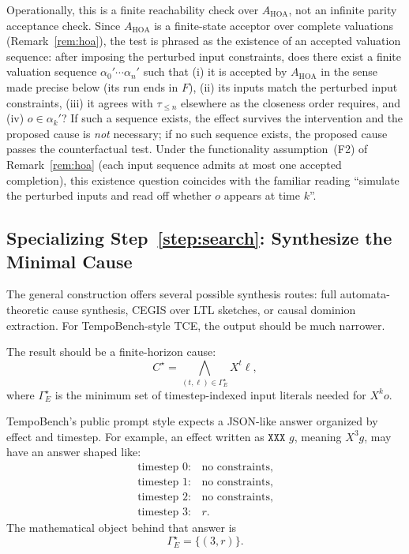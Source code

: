 \documentclass[11pt]{article}
\theoremstyle{remark}
\begin{document}
Operationally, this is a finite reachability check over \(A_{\mathrm{HOA}}\), not
an infinite parity acceptance check. Since \(A_{\mathrm{HOA}}\) is a finite-state
acceptor over complete valuations (Remark~\ref{rem:hoa}), the test is phrased as
the existence of an accepted valuation sequence: after imposing the perturbed
input constraints, does there exist a finite valuation sequence
\(\alpha_0'\cdots\alpha_n'\) such that (i) it is accepted by \(A_{\mathrm{HOA}}\)
in the sense made precise below (its run ends in \(F\)), (ii) its inputs match
the perturbed input constraints, (iii) it agrees with \(\tau_{\le n}\) elsewhere
as the closeness order requires, and (iv) \(o\in\alpha_k'\)? If such a sequence
exists, the effect survives the intervention and the proposed cause is \emph{not}
necessary; if no such sequence exists, the proposed cause passes the
counterfactual test. Under the functionality assumption~(F2) of
Remark~\ref{rem:hoa} (each input sequence admits at most one accepted completion),
this existence question coincides with the familiar reading ``simulate the
perturbed inputs and read off whether \(o\) appears at time \(k\)''.

\subsection{Specializing Step~\ref{step:search}: Synthesize the Minimal Cause}

The general construction offers several possible synthesis routes: full
automata-theoretic cause synthesis, CEGIS over LTL sketches, or causal dominion
extraction. For TempoBench-style TCE, the output should be much narrower.

The result should be a finite-horizon cause:
\[
  C^\star =
  \bigwedge_{(t,\ell)\in\Gamma_E^\star} X^t\ell,
\]
where \(\Gamma_E^\star\) is the minimum set of timestep-indexed input literals
needed for \(X^k o\).

TempoBench's public prompt style expects a JSON-like answer organized by effect
and timestep. For example, an effect written as \(\texttt{XXX }g\), meaning
\(X^3 g\), may have an answer shaped like:
\[
\begin{array}{ll}
  \text{timestep }0: & \text{no constraints},\\
  \text{timestep }1: & \text{no constraints},\\
  \text{timestep }2: & \text{no constraints},\\
  \text{timestep }3: & r.
\end{array}
\]
The mathematical object behind that answer is
\[
  \Gamma_E^\star=\{(3,r)\}.
\]
\end{document}
